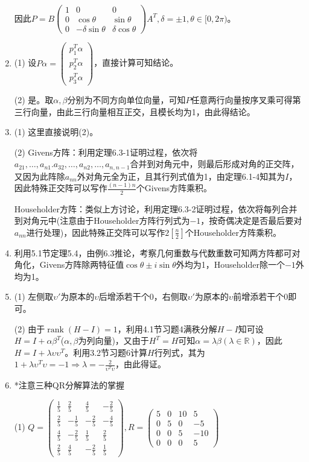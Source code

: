 \documentclass[a4paper,UTF8,fontset=windows]{ctexart}
\DeclareMathOperator{\rank}{rank}
\begin{document}
\begin{enumerate}
因此$P=B\begin{pmatrix}1&0&0\\0&\cos\theta&\sin\theta\\0&-\delta\sin\theta&\delta\cos\theta\end{pmatrix}A^T,\delta=\pm1,\theta\in[0,2\pi)$。

\item
(1) 设$P\alpha=\begin{pmatrix}p_1^T\alpha\\p_2^T\alpha\\p_3^T\alpha\end{pmatrix}$，直接计算可知结论。

(2) 是。取$\alpha,\beta$分别为不同方向单位向量，可知$P$任意两行向量按序叉乘可得第三行向量，由此三行向量相互正交，且模长均为1，由此得结论。

\item
(1) 这里直接说明(2)。

(2) Givens方阵：利用定理6.3-1证明过程，依次将$a_{21},\dots,a_{n1}.a_{32},\dots,a_{n2},\dots,a_{n,n-1}$合并到对角元中，则最后形成对角的正交阵，又因为此阵除$a_{nn}$外对角元全为正，且其行列式值为1，由定理6.1-4知其为$I$，因此特殊正交阵可以写作$\frac{(n-1)n}{2}$个Givens方阵乘积。

Householder方阵：类似上方讨论，利用定理6.3-2证明过程，依次将每列合并到对角元中(注意由于Householder方阵行列式为$-1$，按奇偶决定是否最后要对$a_{nn}$进行处理)，因此特殊正交阵可以写作$2\left[\frac{n}{2}\right]$个Householder方阵乘积。

\item
利用5.1节定理5.4，由例6.3推论，考察几何重数与代数重数可知两方阵都可对角化，Givens方阵除两特征值$\cos\theta\pm i\sin\theta$外均为1，Householder除一个$-1$外均为1。

\item
(1) 左侧取$\upsilon'$为原本的$\upsilon$后增添若干个0，右侧取$\upsilon'$为原本的$\upsilon$前增添若干个0即可。

(2) 由于$\rank(H-I)=1$，利用4.1节习题4满秩分解$H-I$知可设$H=I+\alpha\beta^T$($\alpha,\beta$为列向量)，又由于$H^T=H$可知$\alpha=\lambda\beta(\lambda\in\mathbb{R})$，因此$H=I+\lambda\upsilon\upsilon^T$。利用3.2节习题6计算$H$行列式，其为$1+\lambda\upsilon^T\upsilon=-1\Rightarrow\lambda=-\frac{2}{\upsilon^T\upsilon}$，由此得证。

\item
*注意三种QR分解算法的掌握

(1) $Q=\begin{pmatrix}\frac{1}{5}&\frac{2}{5}&\frac{4}{5}&-\frac{2}{5}\\[1.5ex]\frac{2}{5}&-\frac{1}{5}&-\frac{2}{5}&-\frac{4}{5}\\[1.5ex]\frac{4}{5}&-\frac{2}{5}&\frac{1}{5}&\frac{2}{5}\\[1.5ex]\frac{2}{5}&\frac{4}{5}&-\frac{2}{5}&\frac{1}{5}\end{pmatrix},R=\begin{pmatrix}5&0&10&5\\0&5&0&-5\\0&0&5&-10\\0&0&0&5\end{pmatrix}$


\end{enumerate}
\end{document}
